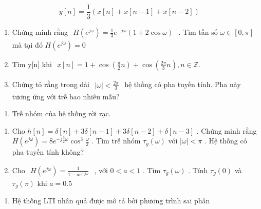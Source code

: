 \documentclass[
  10
]{article}
\providecommand{\tightlist}{%
  \setlength{\itemsep}{0pt}\setlength{\parskip}{0pt}}
\begin{document}
\[
y [ n ] = \frac {1}{3} (x [ n ] + x [ n - 1 ] + x [ n - 2 ])
\]

\begin{enumerate}
\def\labelenumi{(\alph{enumi})}
\item
  Chứng minh rằng
  \(\begin{array} { r } { H ( e ^ { j \omega } ) = \frac { 1 } { 3 } e ^ { - j \omega } ( 1 + 2 \cos \omega ) } \end{array}\)
  . Tìm tần số \(\omega \in [ 0 , \pi ]\) mà tại đó
  \(H ( e ^ { j \omega } ) = 0\)
\item
  Tìm y{[}n{]} khi
  \(\begin{array} { r } { x [ n ] = 1 + \cos ( \frac { \pi } { 2 } n ) + \cos ( \frac { 2 \pi } { 3 } n ) , n \in \mathbb { Z } . } \end{array}\)
\item
  Chứng tỏ rằng trong dải
  \(\begin{array} { r } { | \omega | < \frac { 2 \pi } { 3 } } \end{array}\)
  hệ thống có pha tuyến tính. Pha này tương ứng với trễ bao nhiêu mẫu?
\end{enumerate}

\begin{enumerate}
\def\labelenumi{\arabic{enumi}.}
\setcounter{enumi}{23}
\tightlist
\item
  Trễ nhóm của hệ thống rời rạc.
\end{enumerate}

\begin{enumerate}
\def\labelenumi{(\alph{enumi})}
\item
  Cho
  \(h [ n ] = \delta [ n ] + 3 \delta [ n - 1 ] + 3 \delta [ n - 2 ] + \delta [ n - 3 ]\)
  . Chứng minh rằng
  \(H ( e ^ { j \omega } ) = 8 e ^ { - j \frac { 3 } { 2 } \omega } \cos ^ { 3 } \frac { \omega } { 2 }\)
  . Tìm trễ nhóm \(\tau _ { g } ( \omega )\) với \(| \omega | < \pi\) .
  Hệ thống có pha tuyến tính không?
\item
  Cho
  \(\begin{array} { r } { H ( e ^ { j \omega } ) = \frac { 1 } { 1 - a e ^ { - j \omega } } } \end{array}\)
  , với \(0 < a < 1\) . Tìm \(\tau _ { g } ( \omega )\) . Tính
  \(\tau _ { g } ( 0 )\) và \(\tau _ { g } ( \pi )\) khi \(a = 0 . 5\)
\end{enumerate}

\begin{enumerate}
\def\labelenumi{\arabic{enumi}.}
\setcounter{enumi}{24}
\tightlist
\item
  Hệ thống LTI nhân quả được mô tả bởi phương trình sai phân
\end{enumerate}
\end{document}
